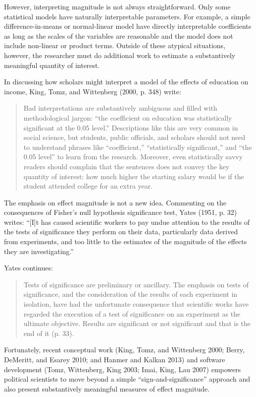 \documentclass[12pt]{article}
\begin{document}
However, interpreting magnitude is not always straightforward. Only some statistical models have naturally interpretable parameters. For example, a simple difference-in-means or normal-linear model have directly interpretable coefficients as long as the scales of the variables are reasonable and the model does not include non-linear or product terms. Outside of these atypical situations, however, the researcher must do additional work to estimate a substantively meaningful quantity of interest.

In discussing how scholars might interpret a model of the effects of education on income, King, Tomz, and Wittenberg (2000, p. 348) write:

\begin{quote}
Bad interpretations are substantively ambiguous and filled with methodological jargon: ``the coefficient on education was statistically significant at the 0.05 level.'' Descriptions like this are very common in social science, but students, public officials, and scholars should not need to understand phrases like ``coefficient,'' ``statistically significant,'' and ``the 0.05 level'' to learn from the research. Moreover, even statistically savvy readers should complain that the sentences does not convey the key quantity of interest: how much higher the starting salary would be if the student attended college for an extra year.
\end{quote}

The emphasis on effect magnitude is not a new idea. Commenting on the consequences of Fisher's null hypothesis significance test, Yates (1951, p. 32) writes: ``[I]t has caused scientific workers to pay undue attention to the results of the tests of significance they perform on their data, particularly data derived from experiments, and too little to the estimates of the magnitude of the effects they are investigating.'' 

Yates continues: 

\begin{quote}
Tests of significance are preliminary or ancillary. The emphasis on tests of significance, and the consideration of the results of each experiment in isolation, have had the unfortunate consequence that scientific works have regarded the execution of a test of significance on an experiment as the ultimate objective. Results are significant or not significant and that is the end of it (p. 33).
\end{quote}

Fortunately, recent conceptual work (King, Tomz, and Wittenberg 2000; Berry, DeMeritt, and Esarey 2010; and Hanmer and Kalkan 2013) and software development (Tomz, Wittenberg, King 2003; Imai, King, Lau 2007) empowers political scientists to move beyond a simple ``sign-and-significance'' approach and also present substantively meaningful measures of effect magnitude.
\end{document}
